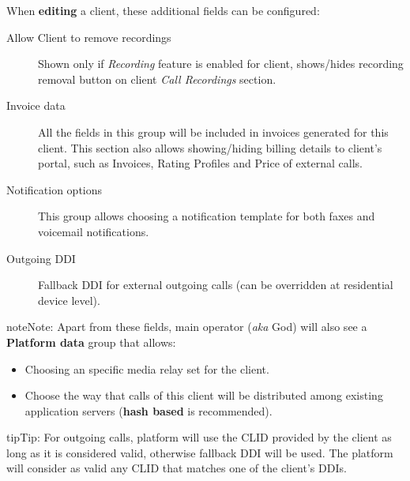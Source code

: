 \documentclass[letterpaper,10pt,english]{sphinxmanual}
\begin{document}
When \textbf{editing} a client, these additional fields can be configured:
\begin{description}
\item[{Allow Client to remove recordings}] \leavevmode{}\label{administration_portal/brand/clients/residential:term-allow-client-to-remove-recordings}
Shown only if \emph{Recording} feature is enabled for client, shows/hides recording
removal button on client \emph{Call Recordings} section.

\item[{Invoice data}] \leavevmode{}\label{administration_portal/brand/clients/residential:term-invoice-data}
All the fields in this group will be included in invoices generated for this client. This section also allows
showing/hiding billing details to client's portal, such as Invoices, Rating Profiles and Price of external calls.

\item[{Notification options}] \leavevmode{}\label{administration_portal/brand/clients/residential:term-notification-options}
This group allows choosing a notification template for both faxes and voicemail notifications.

\item[{Outgoing DDI}] \leavevmode{}\label{administration_portal/brand/clients/residential:term-outgoing-ddi}
Fallback DDI for external outgoing calls (can be overridden at residential device level).

\end{description}

\begin{notice}{note}{Note:}
Apart from these fields, main operator (\emph{aka} God) will also see a \textbf{Platform data} group that allows:
\begin{itemize}
\item {} 
Choosing an specific media relay set for the client.

\item {} 
Choose the way that calls of this client will be distributed among existing application servers (\textbf{hash based} is recommended).

\end{itemize}
\end{notice}

\begin{notice}{tip}{Tip:}
For outgoing calls, platform will use the CLID provided by the client as long as it is considered valid, otherwise fallback DDI
will be used. The platform will consider as valid any CLID that matches one of the client's DDIs.
\end{notice}
\end{document}
